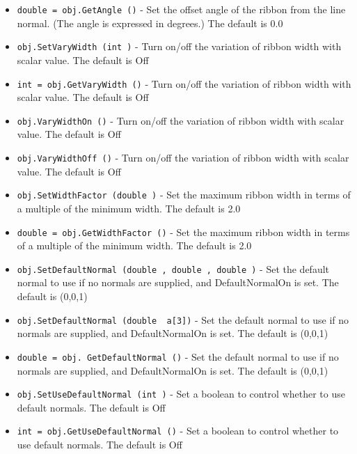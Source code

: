 \begin{itemize}
\item  \verb|double = obj.GetAngle ()| -  Set the offset angle of the ribbon from the line normal. (The angle
 is expressed in degrees.) The default is 0.0

\item  \verb|obj.SetVaryWidth (int )| -  Turn on/off the variation of ribbon width with scalar value.
 The default is Off

\item  \verb|int = obj.GetVaryWidth ()| -  Turn on/off the variation of ribbon width with scalar value.
 The default is Off

\item  \verb|obj.VaryWidthOn ()| -  Turn on/off the variation of ribbon width with scalar value.
 The default is Off

\item  \verb|obj.VaryWidthOff ()| -  Turn on/off the variation of ribbon width with scalar value.
 The default is Off

\item  \verb|obj.SetWidthFactor (double )| -  Set the maximum ribbon width in terms of a multiple of the minimum width.
 The default is 2.0

\item  \verb|double = obj.GetWidthFactor ()| -  Set the maximum ribbon width in terms of a multiple of the minimum width.
 The default is 2.0

\item  \verb|obj.SetDefaultNormal (double , double , double )| -  Set the default normal to use if no normals are supplied, and
 DefaultNormalOn is set. The default is (0,0,1)

\item  \verb|obj.SetDefaultNormal (double  a[3])| -  Set the default normal to use if no normals are supplied, and
 DefaultNormalOn is set. The default is (0,0,1)

\item  \verb|double = obj. GetDefaultNormal ()| -  Set the default normal to use if no normals are supplied, and
 DefaultNormalOn is set. The default is (0,0,1)

\item  \verb|obj.SetUseDefaultNormal (int )| -  Set a boolean to control whether to use default normals.
 The default is Off

\item  \verb|int = obj.GetUseDefaultNormal ()| -  Set a boolean to control whether to use default normals.
 The default is Off


\end{itemize}
